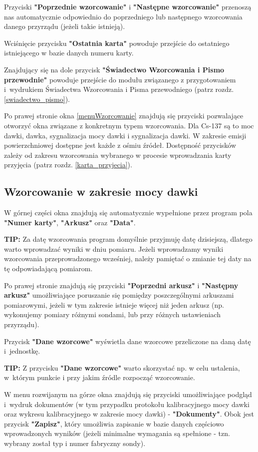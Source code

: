 Przyciski \textbf{"Poprzednie wzorcowanie"} i \textbf{"Następne wzorcowanie"} przenoszą nas automatycznie odpowiednio do poprzedniego lub następnego wzorcowania danego przyrządu (jeżeli takie istnieją).

Wciśnięcie przycisku \textbf{"Ostatnia karta"} powoduje przejście do ostatniego istniejącego w bazie danych numeru karty.

Znajdujący się na dole przycisk \textbf{"Świadectwo Wzorcowania i Pismo przewodnie"} powoduje przejście do modułu związanego z przygotowaniem i~wydrukiem Świadectwa Wzorcowania i Pisma przewodniego (patrz rozdz. \ref{swiadectwo_pismo}).

Po prawej stronie okna \ref{menuWzorcowanie} znajdują się przyciski pozwalające otworzyć okna związane z konkretnym typem wzorcowania. Dla Cs-137 są to moc dawki, dawka, sygnalizacja mocy dawki i sygnalizacja dawki. W zakresie emisji powierzchniowej dostępne jest każde z ośmiu źródeł. Dostępność przycisków zależy od zakresu wzorcowania wybranego w procesie wprowadzania karty przyjęcia (patrz rozdz. \ref{karta_przyjecia}).

\subsection{Wzorcowanie w zakresie mocy dawki}
\label{wzorcowanie_moc_dawki}

W górnej części okna znajdują się automatycznie wypełnione przez program pola \textbf{"Numer karty"}, \textbf{"Arkusz"} oraz \textbf{"Data"}. 

\textbf{TIP:} Za datę wzorcowania program domyślnie przyjmuję datę dzisiejszą, dlatego warto wprowadzać wyniki w dniu pomiaru. Jeżeli wprowadzamy wyniki wzorcowania przeprowadzonego wcześniej, należy pamiętać o zmianie tej daty na tę odpowiadającą pomiarom.

Po prawej stronie znajdują się przyciski \textbf{"Poprzedni arkusz"} i \textbf{"Następny arkusz"} umożliwiające poruszanie się pomiędzy poszczególnymi arkuszami pomiarowymi, jeżeli w tym zakresie istnieje więcej niż jeden arkusz (np. wykonujemy pomiary różnymi sondami, lub przy różnych ustawieniach przyrządu).

Przycisk \textbf{"Dane wzorcowe"} wyświetla dane wzorcowe przeliczone na daną datę i~jednostkę.

\textbf{TIP:} Z przycisku \textbf{"Dane wzorcowe"} warto skorzystać np. w celu ustalenia, w~którym punkcie i przy jakim źródle rozpocząć wzorcowanie.

W menu rozwijanym na górze okna znajdują się przyciski umożliwiające podgląd i~wydruk dokumentów (w tym przypadku protokołu kalibracyjnego mocy dawki oraz wykresu kalibracyjnego w zakresie mocy dawki) - \textbf{"Dokumenty"}. Obok jest przycisk \textbf{"Zapisz"}, który umożliwia zapisanie w bazie danych częściowo wprowadzonych wyników (jeżeli minimalne wymagania są spełnione - tzn. wybrany został typ i numer fabryczny sondy).

